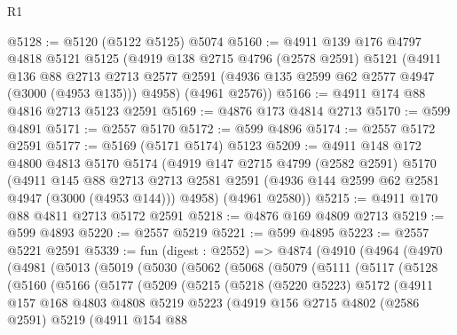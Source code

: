 \begin{lexlean}{R1}
\begin{coremodule}
@5128 := @5120 (@5122 @5125) @5074
@5160 := @4911
    @139
    @176
    @4797
    @4818
    @5121
    @5125
    (@4919
      @138
      @2715
      @4796
      (@2578 @2591)
      @5121
      (@4911
        @136
        @88
        @2713
        @2713
        @2577
        @2591
        (@4936 @135 @2599 @62 @2577 @4947 (@3000 (@4953 @135)))
        @4958)
      (@4961 @2576))
@5166 := @4911 @174 @88 @4816 @2713 @5123 @2591
@5169 := @4876 @173 @4814 @2713
@5170 := @599 @4891
@5171 := @2557 @5170
@5172 := @599 @4896
@5174 := @2557 @5172 @2591
@5177 := @5169 (@5171 @5174) @5123
@5209 := @4911
    @148
    @172
    @4800
    @4813
    @5170
    @5174
    (@4919
      @147
      @2715
      @4799
      (@2582 @2591)
      @5170
      (@4911
        @145
        @88
        @2713
        @2713
        @2581
        @2591
        (@4936 @144 @2599 @62 @2581 @4947 (@3000 (@4953 @144)))
        @4958)
      (@4961 @2580))
@5215 := @4911 @170 @88 @4811 @2713 @5172 @2591
@5218 := @4876 @169 @4809 @2713
@5219 := @599 @4893
@5220 := @2557 @5219
@5221 := @599 @4895
@5223 := @2557 @5221 @2591
@5339 := fun (digest : @2552) =>
  @4874
    (@4910
      (@4964
        (@4970
          (@4981
            (@5013
              (@5019
                (@5030
                  (@5062
                    (@5068
                      (@5079
                        (@5111
                          (@5117
                            (@5128
                              (@5160
                                (@5166
                                  (@5177
                                    (@5209
                                      (@5215
                                        (@5218
                                          (@5220 @5223)
                                          @5172
                                          (@4911
                                            @157
                                            @168
                                            @4803
                                            @4808
                                            @5219
                                            @5223
                                            (@4919
                                              @156
                                              @2715
                                              @4802
                                              (@2586 @2591)
                                              @5219
                                              (@4911
                                                @154
                                                @88

\end{coremodule}
\end{lexlean}

